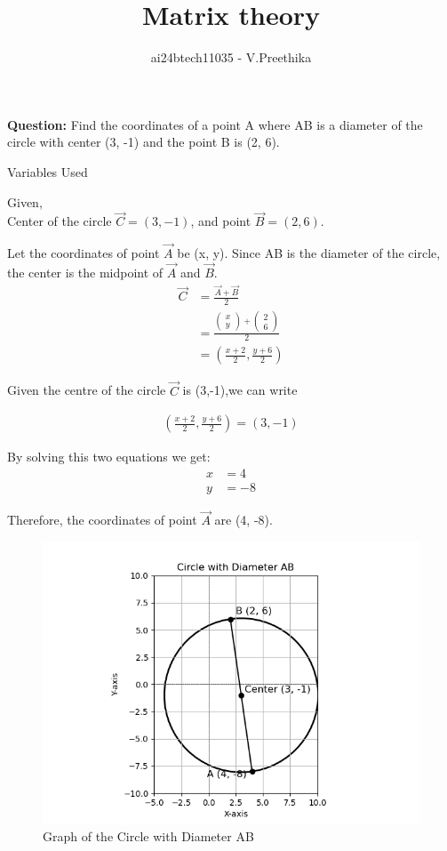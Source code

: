 \documentclass[journal]{IEEEtran}
\begin{document}

\vspace{3cm}

\title{Matrix theory}
\author{ai24btech11035 - V.Preethika}
\maketitle
\bigskip
\newcommand{\createMat}[2]{\begin{pmatrix} #1 \\ #2 \end{pmatrix}}
\renewcommand{\thefigure}{\theenumi}
\renewcommand{\thetable}{\theenumi}

\textbf{Question:} Find the coordinates of a point A where AB is a diameter of the circle with center (3, -1) and the point B is (2, 6).\\
	    
\begin{table}[h!]
	\centering
  
	\caption{Variables Used}
	\label{tab1.5.16}
\end{table}
    \solution 
    Given,\\
    Center of the circle $\vec{C} = (3, -1)$, and point $\vec{B} = (2, 6)$.
    
    Let the coordinates of point $\vec{A}$ be (x, y).  
    Since AB is the diameter of the circle, the center is the midpoint of $\vec{A}$ and $\vec{B}$.
	\begin{align}
    \vec{C} &= \frac{\vec{A}+\vec{B}}{2} \\
		&= \frac{\createMat{x}{y} + \createMat{2}{6}}{2} \\
             &= \left(\frac{x+2}{2}, \frac{y+6}{2}\right)
	\end{align}
	  
    
		Given the centre of the circle $\vec{C}$ is (3,-1),we can write
    
		\begin{align}
    \left( \frac{x + 2}{2}, \frac{y + 6}{2} \right) = (3, -1)
		\end{align}
    
    By solving this two equations we get:
    \begin{align}
	    x &= 4 \\
	    y &= -8
    \end{align}

    
    Therefore, the coordinates of point $\vec{A}$ are (4, -8).
    

\begin{figure}[ht]
   \centering
   \includegraphics[width=0.7\linewidth]{Figs/fig_1.png}
   \caption{Graph of the Circle with Diameter AB}
   \label{q16}
\end{figure}
\end{document}
